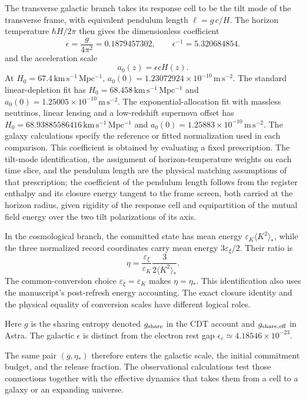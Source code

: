 The transverse galactic branch takes its response cell to be the tilt
mode of the transverse frame, with equivalent pendulum length $\ell=g\,c/H$. The
horizon temperature $\hbar H/2\pi$ then gives the dimensionless coefficient
\begin{equation}
\epsilon=\frac{g}{4\pi^2}=0.1879457302,
\qquad \epsilon^{-1}=5.320684854.
\label{eq:eps}
\end{equation}
and the acceleration scale
\begin{equation}
a_0(z)=\epsilon cH(z).
\label{eq:a0}
\end{equation}
At $H_0=67.4\,\mathrm{km\,s^{-1}\,Mpc^{-1}}$,
$a_0(0)=1.23072924\times10^{-10}\,\mathrm{m\,s^{-2}}$.
The standard linear-depletion fit has $H_0=68.458\,\mathrm{km\,s^{-1}\,Mpc^{-1}}$
and $a_0(0)=1.25005\times10^{-10}\,\mathrm{m\,s^{-2}}$.
The exponential-allocation fit with massless neutrinos, linear lensing and
a low-redshift supernova offset has $H_0=68.93885586416\,\mathrm{km\,s^{-1}\,Mpc^{-1}}$
and $a_0(0)=1.25883\times10^{-10}\,\mathrm{m\,s^{-2}}$.
The galaxy calculations specify the reference or fitted normalization used
in each comparison.
This coefficient is obtained by evaluating a fixed prescription.
The tilt-mode identification, the assignment of horizon-temperature weights on each time slice, and the pendulum length are the physical matching assumptions of that prescription; the coefficient of the pendulum length follows from the register enthalpy and its closure energy tangent
to the frame screen, both carried at the horizon radius, given rigidity of the response cell and equipartition of the mutual field energy over the two tilt polarizations of its axis. 

In the cosmological branch, the committed state has mean energy
$\varepsilon_K\langle K^2\rangle_*$, while the three normalized record
coordinates carry mean energy $3\varepsilon_\xi/2$. Their ratio is
\begin{equation}
\eta=\frac{\varepsilon_\xi}{\varepsilon_K}
\frac{3}{2\langle K^2\rangle_*}.
\label{eq:etaenergy}
\end{equation}
The common-conversion choice $\varepsilon_\xi=\varepsilon_K$ makes
$\eta=\eta_*$. This identification also uses the manuscript's post-refresh
energy accounting. The exact closure identity and the physical equality
of conversion scales have different logical roles. 

Here $g$ is the sharing entropy denoted $g_{\rm share}$ in the CDT
account and $g_{\rm share,eff}$ in Astra. The galactic $\epsilon$ is
distinct from the electron rest gap $\epsilon_e\simeq4.18546\times10^{-23}$.

The same pair $(g,\eta_*)$ therefore enters the galactic scale, the initial
commitment budget, and the release fraction. The observational calculations
test those connections together with the effective dynamics that takes
them from a cell to a galaxy or an expanding universe.
